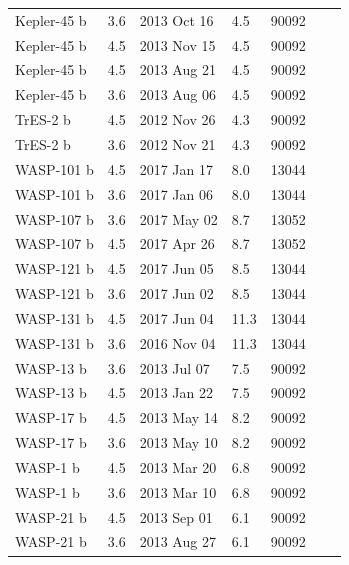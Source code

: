 \begin{longtable}[h]{lllllll}
Kepler-45 b &               3.6 &   2013 Oct 16 &         4.5 &       90092 \\
Kepler-45 b &               4.5 &   2013 Nov 15 &         4.5 &       90092 \\
Kepler-45 b &               4.5 &   2013 Aug 21 &         4.5 &       90092 \\
Kepler-45 b &               3.6 &   2013 Aug 06 &         4.5 &       90092 \\
TrES-2 b     &               4.5 &   2012 Nov 26 &         4.3 &       90092 \\
TrES-2 b     &               3.6 &   2012 Nov 21 &         4.3 &       90092 \\
WASP-101 b   &               4.5 &   2017 Jan 17 &         8.0 &       13044 \\
WASP-101 b   &               3.6 &   2017 Jan 06 &         8.0 &       13044 \\
WASP-107 b  &               3.6 &   2017 May 02 &         8.7 &       13052 \\
WASP-107 b  &               4.5 &   2017 Apr 26 &         8.7 &       13052 \\
WASP-121 b   &               4.5 &   2017 Jun 05 &         8.5 &       13044 \\
WASP-121 b   &               3.6 &   2017 Jun 02 &         8.5 &       13044 \\
WASP-131 b   &               4.5 &   2017 Jun 04 &        11.3 &       13044 \\
WASP-131 b   &               3.6 &   2016 Nov 04 &        11.3 &       13044 \\
WASP-13 b   &               3.6 &   2013 Jul 07 &         7.5 &       90092 \\
WASP-13 b   &               4.5 &   2013 Jan 22 &         7.5 &       90092 \\
WASP-17 b   &               4.5 &   2013 May 14 &         8.2 &       90092 \\
WASP-17 b   &               3.6 &   2013 May 10 &         8.2 &       90092 \\
WASP-1 b    &               4.5 &   2013 Mar 20 &         6.8 &       90092 \\
WASP-1 b    &               3.6 &   2013 Mar 10 &         6.8 &       90092 \\
WASP-21 b   &               4.5 &   2013 Sep 01 &         6.1 &       90092 \\
WASP-21 b   &               3.6 &   2013 Aug 27 &         6.1 &       90092 \\

\end{longtable}
